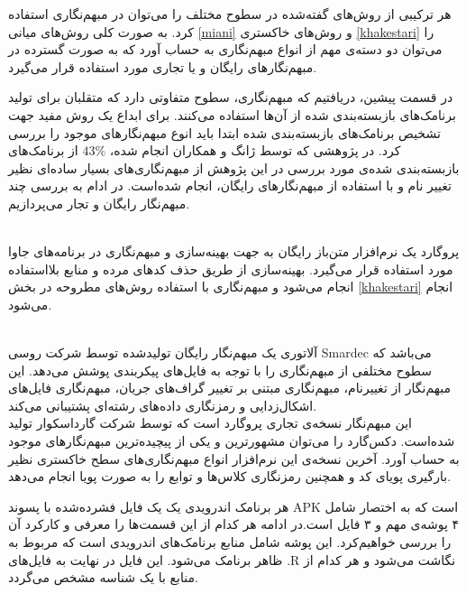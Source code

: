 هر ترکیبی از روش‌های گفته‌شده در سطوح مختلف را می‌توان در مبهم‌نگاری استفاده کرد. به صورت کلی روش‌های میانی 
\ref{miani}
و روش‌های خاکستری
\ref{khakestari}
را می‌توان دو دسته‌ی مهم از انواع مبهم‌نگاری به حساب آورد که به صورت گسترده در مبهم‌نگار‌های رایگان و یا تجاری مورد استفاده قرار می‌گیرد.




در قسمت پیشین، دریافتیم که مبهم‌نگاری، سطوح متفاوتی دارد که متقلبان برای تولید برنامک‌های بازبسته‌بندی شده از آن‌ها استفاده می‌کنند. برای ابداع یک روش مفید جهت تشخیص برنامک‌های بازبسته‌بندی شده ابتدا باید انوع مبهم‌نگار‌های موجود را بررسی کرد. در پژوهشی که توسط ژانگ و همکاران انجام ‌شده،
$43\%$
از برنامک‌های بازبسته‌بندی شده‌ی مورد بررسی در این پژوهش از مبهم‌نگاری‌های بسیار ساده‌ای نظیر تغییر نام و با استفاده از مبهم‌نگار‌های رایگان، انجام شده‌است. در ادام به بررسی چند مبهم‌نگار رایگان و تجار می‌پردازیم. 

 \\
پروگارد یک نرم‌افزار متن‌باز رایگان به جهت بهینه‌سازی و مبهم‌نگاری در برنامه‌های جاوا مورد استفاده قرار می‌گیرد. بهینه‌سازی از طریق حذف کد‌های مرده و منابع بلااستفاده انجام می‌شود و مبهم‌نگاری با استفاده  روش‌‌های مطروحه در بخش 
\ref{khakestari}
انجام می‌شود.

\\
آلاتوری یک مبهم‌نگار رایگان تولید‌شده توسط شرکت روسی Smardec می‌باشد که سطوح مختلفی از مبهم‌نگاری را با توجه به فایل‌های پیکر‌بندی پوشش می‌دهد. این مبهم‌نگار از تغییرنام، مبهم‌نگاری مبتنی بر تغییر گراف‌های جریان، مبهم‌نگاری فایل‌های اشکال‌زدایی و رمز‌نگاری داده‌های رشته‌ای پشتیبانی می‌کند.
\\
این مبهم‌نگار نسخه‌ی تجاری پروگارد است که توسط شرکت گارداسکوار تولید شده‌است. دکس‌گارد را می‌توان مشهورترین و یکی از پیچیده‌ترین مبهم‌نگار‌های موجود به حساب آورد. آخرین نسخه‌ی این نرم‌افزار انواع مبهم‌نگاری‌های سطح خاکستری نظیر بارگیری پویای کد و همچنین رمزنگاری کلاس‌ها و توابع را به صورت پویا انجام می‌دهد.


هر برنامک اندرویدی یک یک فایل فشرده‌شده با پسوند APK است که به اختصار شامل ۴ پوشه‌ی مهم و ۳ فایل است.در ادامه هر کدام از این قسمت‌ها را معرفی و کارکرد آن‌ را بررسی خواهیم‌کرد.
 این پوشه شامل منابع برنامک‌های اندرویدی است که مربوط به ظاهر برنامک می‌شود. این فایل در نهایت به فایل‌های {.R} نگاشت می‌شود و هر کدام از منابع با یک شناسه مشخص می‌گردد.

